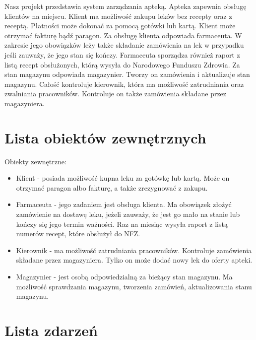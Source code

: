 \documentclass[a4paper, 11pt]{article}
\begin{document}
	Nasz projekt przedstawia system zarządzania apteką. \newline
	\newline \indent 
	Apteka zapewnia obsługę klientów na miejscu.
	Klient ma możliwość zakupu leków bez recepty oraz z receptą. Płatności może dokonać za pomocą gotówki lub kartą. Klient może otrzymać fakturę bądź paragon.  \newline 
	\newline \indent
	Za obsługę klienta  odpowiada farmaceuta. W zakresie jego obowiązków leży także składanie zamówienia na lek w przypadku jeśli zauważy, że jego stan się kończy. Farmaceuta sporządza również raport z listą recept obsłużonych, którą wysyła do Narodowego Funduszu Zdrowia. \newline
	\newline \indent
	Za stan magazynu odpowiada magazynier. Tworzy on zamówienia i aktualizuje stan magazynu. \newline   
	\newline \indent
	Całość kontroluje kierownik, która ma możliwość zatrudniania oraz zwalniania pracowników. Kontroluje on także zamówienia składane przez magazyniera.	
	\section{Lista obiektów zewnętrznych}
	Obiekty zewnętrzne:
	\begin{itemize}
	\item Klient - posiada możliwość kupna leku za gotówkę lub kartą. Może on otrzymać paragon albo fakturę, a także zrezygnować z zakupu.
	\item Farmaceuta - jego zadaniem jest obsługa klienta. Ma obowiązek złożyć zamówienie na dostawę leku, jeżeli zauważy, że jest go mało na stanie lub kończy się jego termin ważności. Raz na miesiąc wysyła raport z listą numerów recept, które obsłużył do NFZ.
	\item Kierownik - ma możliwość zatrudniania pracowników. Kontroluje zamówienia składane przez magazyniera. Tylko on może dodać nowy lek do oferty apteki.
	\item Magazynier - jest osobą odpowiedzialną za bieżący stan magazynu. Ma możliwość sprawdzania magazynu, tworzenia zamówień, aktualizowania stanu magazynu.
	\end{itemize}
	\section{Lista zdarzeń}
	
\end{document}
